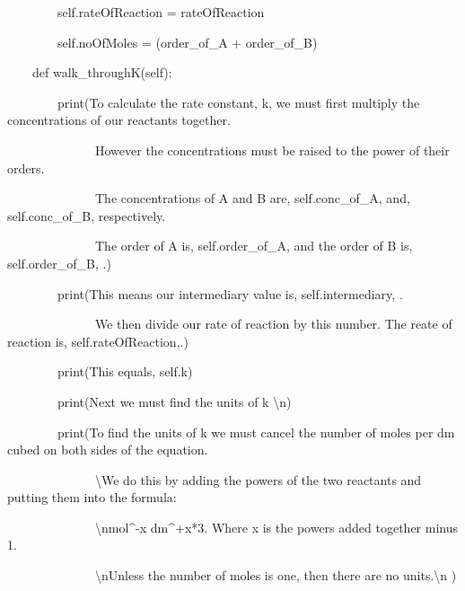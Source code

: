 \documentclass{article}
\begin{document}
\ \ \ \ \ \ \ \ self.rateOfReaction = rateOfReaction

\ \ \ \ \ \ \ \ self.noOfMoles = (order\_of\_A + order\_of\_B)


\bigskip


\bigskip

\ \ \ \ def walk\_throughK(self):

\ \ \ \ \ \ \ \ print({\textquotedbl}To calculate the rate constant, k, we must first multiply the concentrations of our reactants together.{\textquotedbl}

\ \ \ \ \ \ \ \ \ \ \ \ \ \ {\textquotedbl}However the concentrations must be raised to the power of their orders.{\textquotedbl}

\ \ \ \ \ \ \ \ \ \ \ \ \ \ {\textquotedbl}The concentrations of A and B are{\textquotedbl}, self.conc\_of\_A, {\textquotedbl}and{\textquotedbl}, self.conc\_of\_B, {\textquotedbl}respectively.{\textquotedbl}

\ \ \ \ \ \ \ \ \ \ \ \ \ \ {\textquotedbl}The order of A is{\textquotedbl}, self.order\_of\_A, {\textquotedbl}and the order of B is{\textquotedbl}, self.order\_of\_B, {\textquotedbl}.{\textquotedbl})

\ \ \ \ \ \ \ \ print({\textquotedbl}This means our intermediary value is{\textquotedbl}, self.intermediary, {\textquotedbl}.{\textquotedbl}

\ \ \ \ \ \ \ \ \ \ \ \ \ \ {\textquotedbl}We then divide our rate of reaction by this number. The reate of reaction is{\textquotedbl}, self.rateOfReaction,{\textquotedbl}.{\textquotedbl})

\ \ \ \ \ \ \ \ print({\textquotedbl}This equals{\textquotedbl}, self.k)

\ \ \ \ \ \ \ \ print({\textquotedbl}Next we must find the units of k {\textbackslash}n{\textquotedbl})

\ \ \ \ \ \ \ \ print({\textquotedbl}To find the units of k we must cancel the number of moles per dm cubed on both sides of the equation. {\textquotedbl}

\ \ \ \ \ \ \ \ \ \ \ \ \ \ {\textquotedbl}{\textbackslash}We do this by adding the powers of the two reactants and putting them into the formula: {\textquotedbl}

\ \ \ \ \ \ \ \ \ \ \ \ \ \ {\textquotedbl}{\textbackslash}nmol\^{}-x dm\^{}+x*3. Where x is the powers added together minus 1.{\textquotedbl}

\ \ \ \ \ \ \ \ \ \ \ \ \ \ {\textquotedbl}{\textbackslash}nUnless the number of moles is one, then there are no units.{\textbackslash}n {\textquotedbl})
\end{document}
